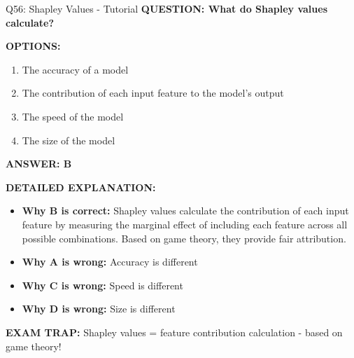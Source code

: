 \documentclass[8pt]{beamer}
\begin{document}
	\begin{frame}{Q56: Shapley Values - Tutorial}
		\fontsize{6.5}{7.5}\selectfont
		\textbf{QUESTION: What do Shapley values calculate?}
		
		\vspace{0.1cm}
		\textbf{OPTIONS:}
		\begin{enumerate}
			\item The accuracy of a model
			\item The contribution of each input feature to the model's output
			\item The speed of the model
			\item The size of the model
		\end{enumerate}
		
		\vspace{0.1cm}
		\textcolor{myblue}{\textbf{ANSWER: B}}
		
		\vspace{0.1cm}
		\textbf{DETAILED EXPLANATION:}
		\begin{itemize}
			\item \textbf{Why B is correct:} Shapley values calculate the contribution of each input feature by measuring the marginal effect of including each feature across all possible combinations. Based on game theory, they provide fair attribution.
			\item \textbf{Why A is wrong:} Accuracy is different
			\item \textbf{Why C is wrong:} Speed is different
			\item \textbf{Why D is wrong:} Size is different
		\end{itemize}
		
		\textcolor{myred}{\textbf{EXAM TRAP:}} Shapley values = \textcolor{myblue}{feature contribution calculation} - based on game theory!
	\end{frame}
	
\end{document}
